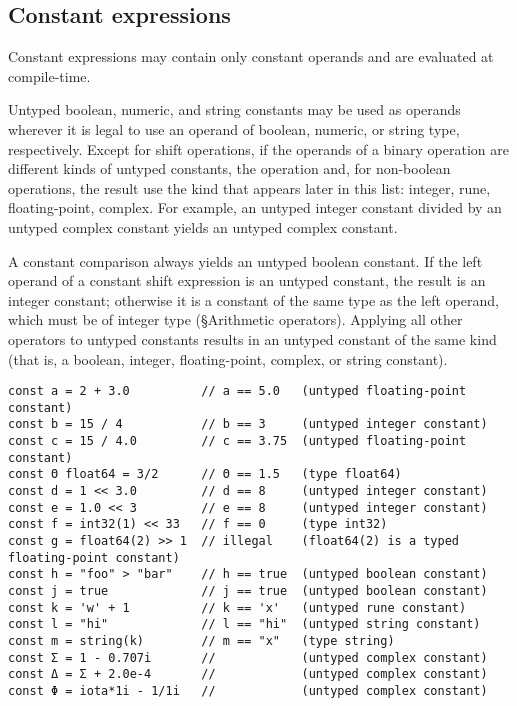 {\subsection*{Constant expressions}

Constant expressions may contain only constant
operands and are evaluated at compile-time.

Untyped boolean, numeric, and string constants may be used as operands
wherever it is legal to use an operand of boolean, numeric, or string
type, respectively. Except for shift operations, if the operands of a
binary operation are different kinds of untyped constants, the operation
and, for non-boolean operations, the result use the kind that appears
later in this list: integer, rune, floating-point, complex. For example,
an untyped integer constant divided by an untyped complex constant
yields an untyped complex constant.

A constant comparison always yields an
untyped boolean constant. If the left operand of a constant
shift expression is an untyped constant, the
result is an integer constant; otherwise it is a constant of the same
type as the left operand, which must be of integer type
(§Arithmetic operators). Applying all
other operators to untyped constants results in an untyped constant of
the same kind (that is, a boolean, integer, floating-point, complex, or
string constant).

\begin{Verbatim}[frame=single]
const a = 2 + 3.0          // a == 5.0   (untyped floating-point constant)
const b = 15 / 4           // b == 3     (untyped integer constant)
const c = 15 / 4.0         // c == 3.75  (untyped floating-point constant)
const Θ float64 = 3/2      // Θ == 1.5   (type float64)
const d = 1 << 3.0         // d == 8     (untyped integer constant)
const e = 1.0 << 3         // e == 8     (untyped integer constant)
const f = int32(1) << 33   // f == 0     (type int32)
const g = float64(2) >> 1  // illegal    (float64(2) is a typed floating-point constant)
const h = "foo" > "bar"    // h == true  (untyped boolean constant)
const j = true             // j == true  (untyped boolean constant)
const k = 'w' + 1          // k == 'x'   (untyped rune constant)
const l = "hi"             // l == "hi"  (untyped string constant)
const m = string(k)        // m == "x"   (type string)
const Σ = 1 - 0.707i       //            (untyped complex constant)
const Δ = Σ + 2.0e-4       //            (untyped complex constant)
const Φ = iota*1i - 1/1i   //            (untyped complex constant)
\end{Verbatim}

}
